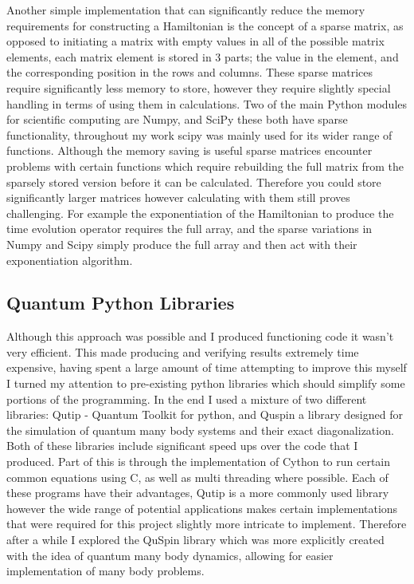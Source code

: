 Another simple implementation that can significantly reduce the memory requirements for constructing a Hamiltonian is the concept of a sparse matrix, as opposed to initiating a matrix with empty values in all of the possible matrix elements, each matrix element is stored in 3 parts; the value in the element, and the corresponding position in the rows and columns. These sparse matrices require significantly less memory to store, however they require slightly special handling in terms of using them in calculations. Two of the main Python modules for scientific computing are Numpy\cite{Numpy}, and SciPy\cite{Scipy} these both have sparse functionality, throughout my work scipy was mainly used for its wider range of functions. 
Although the memory saving is useful sparse matrices encounter problems with certain functions which require rebuilding the full matrix from the sparsely stored version before it can be calculated. Therefore you could store significantly larger matrices however calculating with them still proves challenging. For example the exponentiation of the Hamiltonian to produce the time evolution operator requires the full array, and the sparse variations in Numpy and Scipy simply produce the full array and then act with their exponentiation algorithm.


\subsection{Quantum Python Libraries}
Although this approach was possible and I produced functioning code it wasn't very efficient. This made producing and verifying results extremely time expensive, having spent a large amount of time attempting to improve this myself I turned my attention to pre-existing python libraries which should simplify some portions of the programming.
In the end I used a mixture of two different libraries: Qutip - Quantum Toolkit for python\cite{QUTIP}, and Quspin a library designed for the simulation of quantum many body systems and their exact diagonalization\cite{QUSPIN}. Both of these libraries include significant speed ups over the code that I produced. Part of this is through the implementation of Cython to run certain common equations using C, as well as multi threading where possible. 
Each of these programs have their advantages, Qutip is a more commonly used library however the wide range of potential applications makes certain implementations that were required for this project slightly more intricate to implement. Therefore after a while I explored the QuSpin library which was more explicitly created with the idea of quantum many body dynamics, allowing for easier implementation of many body problems. 

